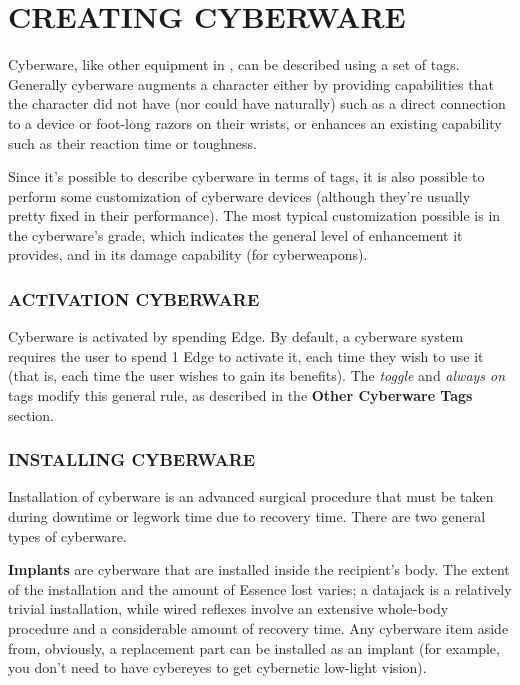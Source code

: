 \documentclass[oneside,10pt]{article}
\begin{document}
\section{CREATING CYBERWARE}
\begin{multicols}{2}
Cyberware, like other equipment in \SW{}, can be described using a set of tags. Generally cyberware augments
a character either by providing capabilities that the character did not have (nor could have naturally) such as a direct
connection to a device or foot-long razors on their wrists, or
enhances an existing capability such as their reaction time or
toughness.

Since it’s possible to describe cyberware in terms of tags,
it is also possible to perform some customization of cyberware devices (although they’re usually pretty fixed in their
performance). The most typical customization possible is in
the cyberware’s grade, which indicates the general level of
enhancement it provides, and in its damage capability (for
cyberweapons).

\subsubsection{ACTIVATION CYBERWARE}
Cyberware is activated by spending Edge. By default, a cyberware system requires the user to spend 1 Edge to activate
it, each time they wish to use it (that is, each time the user
wishes to gain its benefits). The \textit{toggle} and \textit{always on} tags
modify this general rule, as described in the \textbf{Other Cyberware Tags} section.

\subsubsection{INSTALLING CYBERWARE}
Installation of cyberware is an advanced surgical procedure
that must be taken during downtime or legwork time due
to recovery time. There are two general types of cyberware.

\textbf{Implants} are cyberware that are installed inside the recipient’s body. The extent of the installation and the amount of
Essence lost varies; a datajack is a relatively trivial installation,
while wired reflexes involve an extensive whole-body procedure and a considerable amount of recovery time. Any cyberware item aside from, obviously, a replacement part can be
installed as an implant (for example, you don’t need to have
cybereyes to get cybernetic low-light vision).


\end{multicols}
\end{document}

